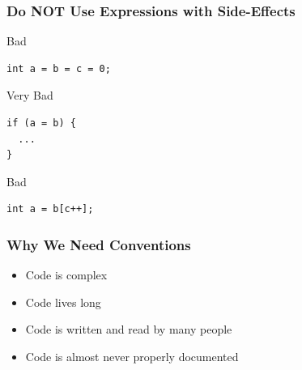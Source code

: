\documentclass[screen]{beamer}
\begin{document}
\begin{frame}[fragile]
\frametitle{Do NOT Use Expressions with Side-Effects}%
\begin{alertblock}{Bad}
\begin{lstlisting}
int a = b = c = 0;
\end{lstlisting}
\end{alertblock}

\begin{alertblock}{Very Bad}
\begin{lstlisting}
if (a = b) {
  ...
}
\end{lstlisting}

\begin{alertblock}{Bad}
\begin{lstlisting}
int a = b[c++];
\end{lstlisting}
\end{alertblock}
\end{alertblock}
\end{frame}


\begin{frame}[fragile]
\frametitle{Why We Need Conventions}%
\begin{itemize}[<+->]
	\item Code is complex
	\item Code lives long
	\item Code is written and read by many people
	\item Code is almost never properly documented
\end{itemize}
\end{frame}


\end{document}
